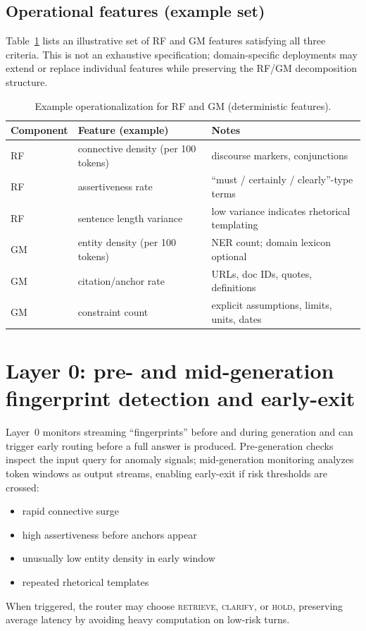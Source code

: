 \documentclass[11pt,a4paper]{article}
\begin{document}
\subsection{Operational features (example set)}

Table~\ref{tab:features} lists an illustrative set of RF and GM features
satisfying all three criteria. This is not an exhaustive specification;
domain-specific deployments may extend or replace individual features
while preserving the RF/GM decomposition structure.

\begin{table}[h]
\centering
\caption{Example operationalization for RF and GM (deterministic features).}
\label{tab:features}
\begin{tabular}{@{}lll@{}}
\toprule
Component & Feature (example) & Notes \\
\midrule
RF & connective density (per 100 tokens) & discourse markers, conjunctions \\
RF & assertiveness rate & ``must / certainly / clearly''-type terms \\
RF & sentence length variance & low variance indicates rhetorical templating \\
GM & entity density (per 100 tokens) & NER count; domain lexicon optional \\
GM & citation/anchor rate & URLs, doc IDs, quotes, definitions \\
GM & constraint count & explicit assumptions, limits, units, dates \\
\bottomrule
\end{tabular}
\end{table}

\section{Layer 0: pre- and mid-generation fingerprint detection and early-exit}

Layer~0 monitors streaming ``fingerprints'' before and during generation and can
trigger early routing before a full answer is produced.
Pre-generation checks inspect the input query for anomaly signals; mid-generation
monitoring analyzes token windows as output streams, enabling early-exit if risk
thresholds are crossed:
\begin{itemize}
\item rapid connective surge
\item high assertiveness before anchors appear
\item unusually low entity density in early window
\item repeated rhetorical templates
\end{itemize}
When triggered, the router may choose \textsc{retrieve}, \textsc{clarify}, or
\textsc{hold}, preserving average latency by avoiding heavy computation on low-risk turns.
\end{document}
